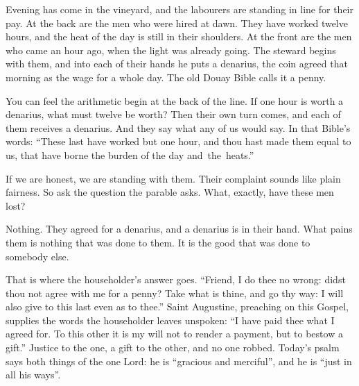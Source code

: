 %

Evening has come in the vineyard, and the labourers are standing in line for
their pay. At the back are the men who were hired at dawn. They have worked
twelve hours, and the heat of the day is still in their shoulders. At the
front are the men who came an hour ago, when the light was already going.
The steward begins with them, and into each of their hands he puts a
denarius, the coin agreed that morning as the wage for a whole day. The old
Douay Bible calls it a penny.

You can feel the arithmetic begin at the back of the line. If one hour is
worth a denarius, what must twelve be worth? Then their own turn comes, and
each of them receives a denarius. And they say what any of us would say. In
that Bible's words: ``These last have worked but one hour, and thou hast made
them equal to us, that have borne the burden of the day and~the~heats.''

If we are honest, we are standing with them. Their complaint sounds like
plain fairness. So ask the question the parable asks. What, exactly, have
these men lost?

Nothing. They agreed for a denarius, and a denarius is in their hand. What
pains them is nothing that was done to them. It is the good that was done to
somebody else.

\bigskip

That is where the householder's answer goes. ``Friend, I do thee no wrong:
didst thou not agree with me for a penny? Take what is thine, and go thy way:
I will also give to this last even as to thee.'' Saint Augustine, preaching
on this Gospel, supplies the words the householder leaves unspoken: ``I have
paid thee what I agreed for. To this other it is my will not to render a
payment, but to bestow a gift.'' Justice to the one, a gift to the other, and
no one robbed. Today's psalm says both things of the one Lord: he is
``gracious and merciful'', and he is ``just in all his ways''.


